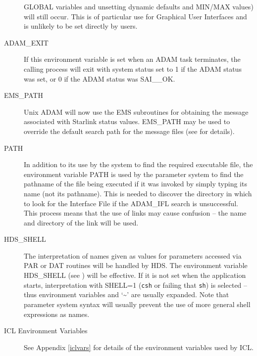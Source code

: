 \documentclass[twoside,11pt,nolof]{starlink}
\begin{document}
\begin{description}
GLOBAL variables and unsetting dynamic defaults and MIN/MAX values) will still
occur.
This is of particular use for Graphical User Interfaces and is unlikely
to be set directly by users.
\item[ADAM\_EXIT] If this environment variable is set when an ADAM task
terminates, the calling process will exit with system status set to 1 if
the ADAM status was set, or 0 if the ADAM status was SAI\_\_OK.
\item[EMS\_PATH] Unix ADAM will now use the EMS subroutines for obtaining the
message associated with Starlink status values. EMS\_PATH may be used to
override the default search path for the message files
(see
for details).
\item[PATH] In addition to its use by the system to find the required
executable file, the environment variable PATH is used by the parameter
system to find the pathname of the file being executed if it was invoked by
simply typing its name (not its pathname).
This is needed to discover the directory in which to look for the Interface
File if the ADAM\_IFL search is unsuccessful.
This process means that the use of links may cause confusion -- the name
and directory of the link will be used.
\item[HDS\_SHELL] The interpretation of names given as values for parameters
accessed via PAR or DAT routines will be handled by HDS.
The environment variable HDS\_SHELL
(see
)
will be effective.
If it is not set when the application starts, interpretation with SHELL=1
(\texttt{csh} or failing that \texttt{sh}) is selected
-- thus environment variables and `\~{}' are usually expanded.
Note that parameter system syntax will usually prevent the use of more general
shell expressions as names.
\item[ICL Environment Variables] See Appendix \ref{iclvars} for details of the
environment variables used by ICL.
\end{description}
\end{document}

